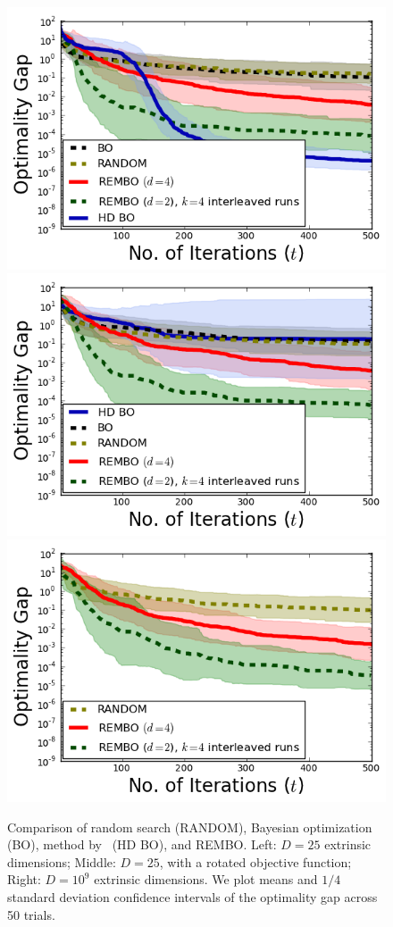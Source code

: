 \documentclass{article}
\begin{document}
\begin{figure}[t!]
  \includegraphics[scale=0.4]{figures/branin_dis_25.png}
  \includegraphics[scale=0.4]{figures/branin_dis_rot.png}
  \includegraphics[scale=0.4]{figures/branin_dis_1b.png}
  \caption{Comparison of random search (RANDOM), Bayesian optimization (BO),
  method by~\protect\cite{Chen:2012} (HD BO), and REMBO.
Left: $D=25$ extrinsic dimensions; Middle: $D=25$, with a rotated objective function; Right: $D=10^9$ extrinsic dimensions. We plot means and $1/4$ standard deviation confidence intervals of the optimality gap across 50 trials.}
  \label{fig:standard}
  \vspace{-1.0em}
\end{figure}
\end{document}
